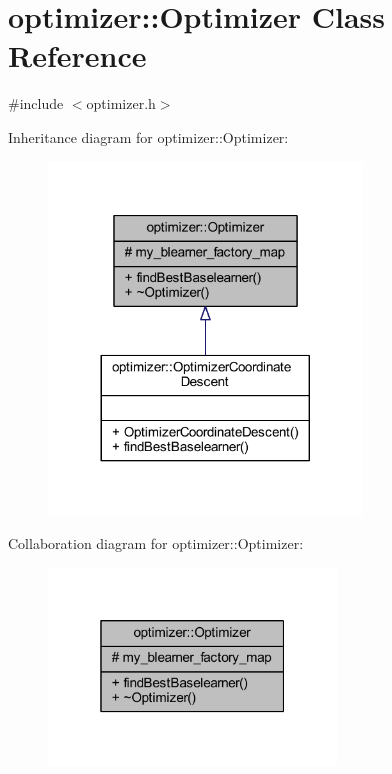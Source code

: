 \hypertarget{classoptimizer_1_1_optimizer}{}\section{optimizer\+:\+:Optimizer Class Reference}
\label{classoptimizer_1_1_optimizer}


{\ttfamily \#include $<$optimizer.\+h$>$}



Inheritance diagram for optimizer\+:\+:Optimizer\+:\nopagebreak
\begin{figure}[H]
\begin{center}
\leavevmode
\includegraphics[width=236pt]{classoptimizer_1_1_optimizer__inherit__graph}
\end{center}
\end{figure}


Collaboration diagram for optimizer\+:\+:Optimizer\+:\nopagebreak
\begin{figure}[H]
\begin{center}
\leavevmode
\includegraphics[width=217pt]{classoptimizer_1_1_optimizer__coll__graph}
\end{center}
\end{figure}
